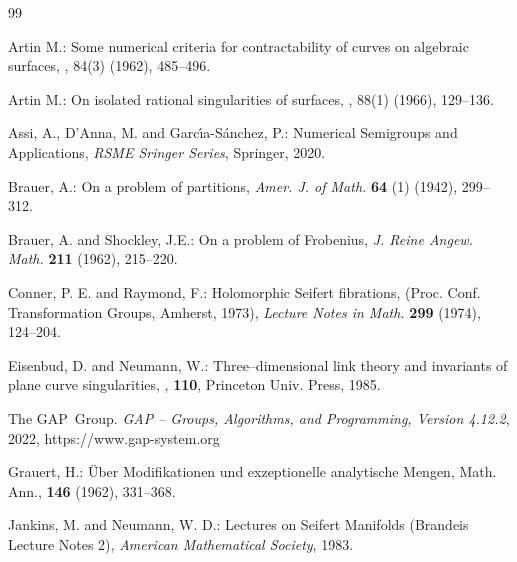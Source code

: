\documentclass[oneside]{amsart}
\numberwithin{equation}{section}
\numberwithin{equation}{subsection}
\theoremstyle{plain}
\theoremstyle{definition}
\begin{document}
\begin{thebibliography}{99}

Artin M.:
\newblock Some numerical criteria for contractability of curves on algebraic
  surfaces,
, 84(3) (1962), 485--496.

Artin M.:
\newblock On isolated rational singularities of surfaces,
, 88(1) (1966), 129--136.

Assi, A., D'Anna, M. and Garc{\'\i}a-S{\'a}nchez, P.: Numerical Semigroups and Applications, {\em  RSME Sringer Series},  Springer, 2020.

Brauer, A.: On a problem of partitions,
{\em Amer. J. of Math.} {\bf 64} (1) (1942), 299--312. 


Brauer, A. and Shockley, J.E.: On a problem of Frobenius,
{\em J. Reine Angew. Math.} {\bf 211} (1962), 215--220. 



 Conner, P. E. and Raymond, F.: Holomorphic Seifert fibrations,
(Proc. Conf. Transformation Groups, Amherst, 1973), {\it Lecture Notes in Math.}
{\bf 299} (1974), 124--204.

Eisenbud, D. and Neumann, W.:
\newblock Three--dimensional link theory and invariants of plane curve
  singularities, 
,  {\bf 110}, 
Princeton Univ. Press, 1985.

  
  The GAP~Group. 
  \newblock \emph{GAP -- Groups, Algorithms, and Programming, 
  Version 4.12.2}, 2022, 
  \newblock https://www.gap-system.org  

 Grauert, H.: \"Uber Modifikationen und exzeptionelle
analytische Mengen,   Math. Ann., {\bf 146} (1962), 331--368.

 Jankins, M. and Neumann, W. D.: Lectures on Seifert Manifolds (Brandeis Lecture Notes 2),
{\em American Mathematical Society}, 1983.



\end{thebibliography}
\end{document}
